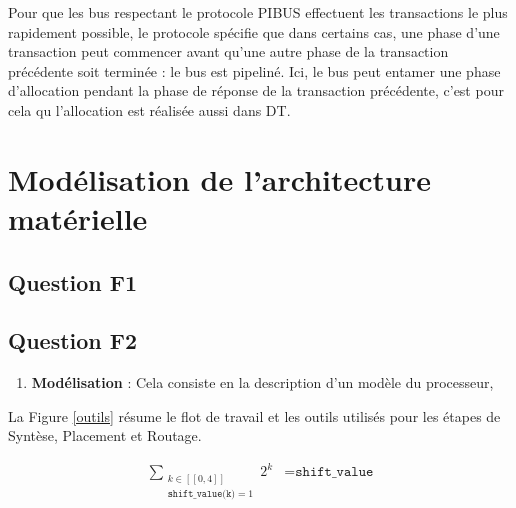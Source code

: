 \documentclass{article}
\begin{document}
Pour que les bus respectant le protocole PIBUS effectuent les transactions le plus
rapidement possible, le protocole spécifie que dans certains cas, une phase d'une transaction
peut commencer avant qu'une autre phase de la transaction précédente soit terminée :
le bus est pipeliné. Ici, le bus peut entamer une phase d'allocation pendant la phase de
réponse de la transaction précédente, c'est pour cela qu l'allocation est réalisée aussi dans DT.


\section{Modélisation de l'architecture matérielle}

\subsection{Question F1}



\subsection{Question F2}



\begin{enumerate}
\item \textbf{Modélisation}  : Cela consiste en la description d'un modèle du processeur,
\end{enumerate}

La Figure \ref{outils} résume le flot de travail et les outils utilisés pour les étapes de Syntèse,
Placement et Routage.

\begin{eqnarray*}
  \sum_{\substack{k \in [[0, 4]] \\ \texttt{shift\_value(k)} = 1}} 2^k &= \texttt{shift\_value}
\end{eqnarray*}

%

\end{document}
